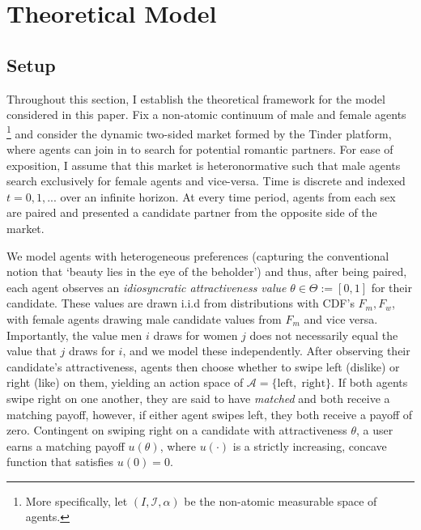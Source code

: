\section{Theoretical Model}
\label{sec: model}
\subsection{Setup} 
Throughout this section, I establish the theoretical framework for the model considered in this paper. Fix a non-atomic continuum of male and female agents \footnote{More specifically, let  $(I, \mathcal{I}, \alpha)$ be the non-atomic measurable space of agents.} and consider the dynamic two-sided market formed by the Tinder platform, where agents can join in to search for potential romantic partners. 
For ease of exposition, I assume that this market is heteronormative such that male agents search exclusively for female agents and vice-versa. 
Time is discrete and indexed $t=0,1,...$ over an infinite horizon. 
At every time period, agents from each sex are paired and presented a candidate partner from the opposite side of the market. 
\begin{comment}
    Each agent has an attractiveness type $\theta \in \Theta := [0,1]$ which is unknown to them but observable to their candidate, and it is common knowledge that this is the case.
\end{comment}
We model agents with heterogeneous preferences (capturing the conventional notion that `beauty lies in the eye of the beholder') and thus, after being paired, each agent observes an \textit{idiosyncratic attractiveness value} $\theta \in \Theta := [0,1]$ for their candidate. These values are drawn i.i.d from distributions with CDF's $F_m, F_w$, with female agents drawing male candidate values from $F_m$ and vice versa. Importantly, the value men $i$ draws for women $j$ does not necessarily equal the value that $j$ draws for $i$, and we model these independently.
After observing their candidate's attractiveness, agents then choose whether to swipe left (dislike) or right (like) on them, yielding an action space of $\mathcal{A}=\{ \text{left},\; \text{right}\}$. 
If both agents swipe right on one another, they are said to have \textit{matched} and both receive a matching payoff, however, if either agent swipes left, they both receive a payoff of zero. Contingent on swiping right on a candidate with attractiveness $\theta$, a user earns a matching payoff $u(\theta)$, where $u(\cdot)$ is a strictly increasing, concave function that satisfies $u(0) = 0$. 
